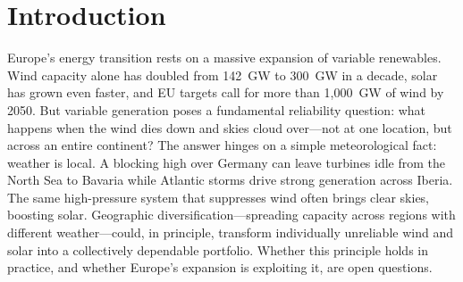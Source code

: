 \documentclass[sn-nature]{sn-jnl}%
\begin{document}

\maketitle

\section{Introduction}\label{sec:intro}

Europe's energy transition rests on a massive expansion of variable renewables. Wind capacity alone has doubled from \SI{142}{\giga\watt} to \SI{300}{\giga\watt} in a decade\cite{windeurope2024}, solar has grown even faster, and EU targets call for more than 1,000~GW of wind by 2050. But variable generation poses a fundamental reliability question: what happens when the wind dies down and skies cloud over---not at one location, but across an entire continent? The answer hinges on a simple meteorological fact: weather is local. A blocking high over Germany can leave turbines idle from the North Sea to Bavaria while Atlantic storms drive strong generation across Iberia. The same high-pressure system that suppresses wind often brings clear skies, boosting solar. Geographic diversification---spreading capacity across regions with different weather---could, in principle, transform individually unreliable wind and solar into a collectively dependable portfolio. Whether this principle holds in practice, and whether Europe's expansion is exploiting it, are open questions.
\end{document}

